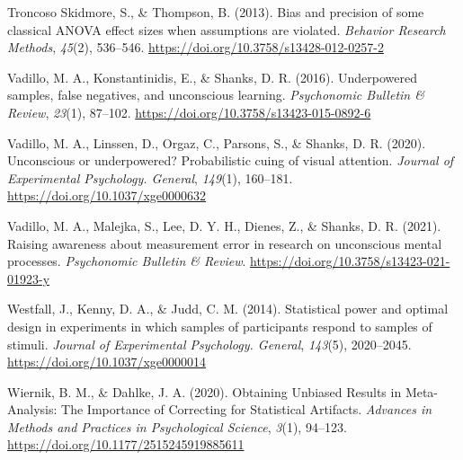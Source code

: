 \documentclass[
  man]{apa6}
\newlength{\cslhangindent}
\newlength{\cslentryspacingunit} %
\newenvironment{CSLReferences}[2] %
 {%
  \setlength{\parindent}{0pt}
  \ifodd #1
  \let\oldpar\par
  \def\par{\hangindent=\cslhangindent\oldpar}
  \fi
  \setlength{\parskip}{#2\cslentryspacingunit}
 }%
 {}
\begin{document}
\begin{CSLReferences}{1}{0}
\leavevmode{}%
Troncoso Skidmore, S., \& Thompson, B. (2013). Bias and precision of some classical {ANOVA} effect sizes when assumptions are violated. \emph{Behavior Research Methods}, \emph{45}(2), 536--546. \url{https://doi.org/10.3758/s13428-012-0257-2}

\leavevmode{}%
Vadillo, M. A., Konstantinidis, E., \& Shanks, D. R. (2016). Underpowered samples, false negatives, and unconscious learning. \emph{Psychonomic Bulletin \& Review}, \emph{23}(1), 87--102. \url{https://doi.org/10.3758/s13423-015-0892-6}

\leavevmode{}%
Vadillo, M. A., Linssen, D., Orgaz, C., Parsons, S., \& Shanks, D. R. (2020). Unconscious or underpowered? {Probabilistic} cuing of visual attention. \emph{Journal of Experimental Psychology. General}, \emph{149}(1), 160--181. \url{https://doi.org/10.1037/xge0000632}

\leavevmode{}%
Vadillo, M. A., Malejka, S., Lee, D. Y. H., Dienes, Z., \& Shanks, D. R. (2021). Raising awareness about measurement error in research on unconscious mental processes. \emph{Psychonomic Bulletin \& Review}. \url{https://doi.org/10.3758/s13423-021-01923-y}

\leavevmode{}%
Westfall, J., Kenny, D. A., \& Judd, C. M. (2014). Statistical power and optimal design in experiments in which samples of participants respond to samples of stimuli. \emph{Journal of Experimental Psychology. General}, \emph{143}(5), 2020--2045. \url{https://doi.org/10.1037/xge0000014}

\leavevmode{}%
Wiernik, B. M., \& Dahlke, J. A. (2020). Obtaining {Unbiased Results} in {Meta-Analysis}: {The Importance} of {Correcting} for {Statistical Artifacts}. \emph{Advances in Methods and Practices in Psychological Science}, \emph{3}(1), 94--123. \url{https://doi.org/10.1177/2515245919885611}

\end{CSLReferences}
\end{document}
